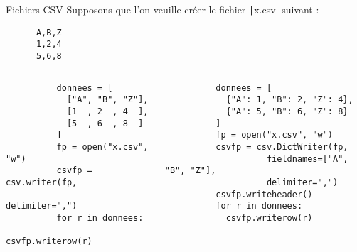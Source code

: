 \documentclass[10pt]{beamer}
\begin{document}
\begin{frame}[fragile]{Fichiers CSV}
  Supposons que l'on veuille créer le fichier \texttt|x.csv| suivant :

  \begin{beamercodeblock}
    \begin{verbatim}
      A,B,Z
      1,2,4
      5,6,8
    \end{verbatim}
  \end{beamercodeblock}

  \begin{columns}
    \begin{column}{0.45\textwidth}


      \begin{beamercodeblock}
        \begin{verbatim}
          donnees = [
            ["A", "B", "Z"],
            [1  , 2  , 4  ],
            [5  , 6  , 8  ]
          ]
          fp = open("x.csv", "w")
          csvfp = csv.writer(fp, 
                    delimiter=",")
          for r in donnees:
            csvfp.writerow(r)
        \end{verbatim}
      \end{beamercodeblock}
    \end{column} \hfill
    \begin{column}{0.52\textwidth}


      \begin{beamercodeblock}
        \begin{verbatim}
          donnees = [
            {"A": 1, "B": 2, "Z": 4},
            {"A": 5, "B": 6, "Z": 8}
          ]
          fp = open("x.csv", "w")
          csvfp = csv.DictWriter(fp,
                    fieldnames=["A", "B", "Z"],
                    delimiter=",")
          csvfp.writeheader()
          for r in donnees:
            csvfp.writerow(r)
        \end{verbatim}
      \end{beamercodeblock}
    \end{column}
  \end{columns}
\end{frame}
\end{document}
